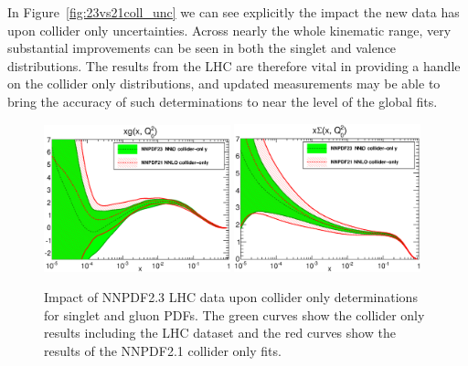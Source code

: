 In Figure~\ref{fig:23vs21coll_unc} we can see explicitly the impact the new data has upon collider only uncertainties. Across nearly the whole kinematic range, very substantial improvements can be seen in both the singlet and valence distributions. The results from the LHC are therefore vital in providing a handle on the collider only distributions, and updated measurements may be able to bring the accuracy of such determinations to near the level of the global fits.

\begin{figure}[h]
\centering
\includegraphics[width=0.48\textwidth]{6-LHCimpact/figs/pdf_xg_log_band_comparison.eps}
\includegraphics[width=0.48\textwidth]{6-LHCimpact/figs/pdf_xSigma_log_band_comparison.eps}
\caption[Impact of NNPDF2.3 LHC data upon collider only determinations for singlet and gluon PDFs]{Impact of NNPDF2.3 LHC data upon collider only determinations for singlet and gluon PDFs. The green curves show the collider only results including the LHC dataset and the red curves show the results of the NNPDF2.1 collider only fits.}
\label{fig:23vs21coll_gs}
\end{figure}


